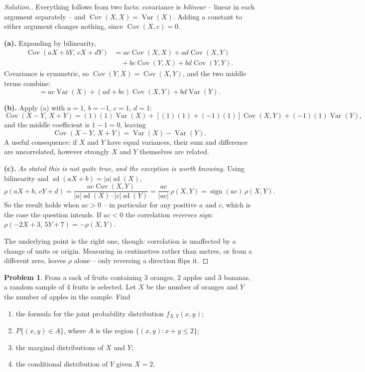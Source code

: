 \documentclass[12pt,a4paper]{report}
\theoremstyle{definition}
\theoremstyle{plain}
\theoremstyle{definition}
\newtheorem{problemx}{Problem}[section]
\newenvironment{problem}{\begin{problemx}}{\end{problemx}}
\newenvironment{solution}
  {\renewcommand{\qedsymbol}{}\begin{proof}[\textit{Solution}.]}
  {\end{proof}}
\begin{document}
\begin{solution}
Everything follows from two facts: covariance is \emph{bilinear} -- linear in each
argument separately -- and $\operatorname{Cov}(X,X) = \operatorname{Var}(X)$. Adding a
constant to either argument changes nothing, since $\operatorname{Cov}(X,c) = 0$.

\textbf{(a).} Expanding by bilinearity,
\begin{align*}
\operatorname{Cov}(aX+bY,\,cX+dY)
&= ac\operatorname{Cov}(X,X)+ad\operatorname{Cov}(X,Y)\\
&\quad + bc\operatorname{Cov}(Y,X)+bd\operatorname{Cov}(Y,Y).
\end{align*}
Covariance is symmetric, so $\operatorname{Cov}(Y,X) = \operatorname{Cov}(X,Y)$, and the
two middle terms combine:
\[= ac\operatorname{Var}(X)+(ad+bc)\operatorname{Cov}(X,Y)+bd\operatorname{Var}(Y).\]

\textbf{(b).} Apply (a) with $a=1$, $b=-1$, $c=1$, $d=1$:
\[\operatorname{Cov}(X-Y,\,X+Y) = (1)(1)\operatorname{Var}(X)
 +[(1)(1)+(-1)(1)]\operatorname{Cov}(X,Y)+(-1)(1)\operatorname{Var}(Y),\]
and the middle coefficient is $1-1 = 0$, leaving
\[\operatorname{Cov}(X-Y,\,X+Y) = \operatorname{Var}(X)-\operatorname{Var}(Y).\]
A useful consequence: if $X$ and $Y$ have equal variances, their sum and difference are
uncorrelated, however strongly $X$ and $Y$ themselves are related.

\textbf{(c).} \emph{As stated this is not quite true, and the exception is worth knowing.}
Using bilinearity and $\operatorname{sd}(aX+b) = |a|\operatorname{sd}(X)$,
\[\rho(aX+b,\,cY+d) = \frac{ac\operatorname{Cov}(X,Y)}
 {|a|\operatorname{sd}(X)\cdot|c|\operatorname{sd}(Y)}
 = \frac{ac}{|ac|}\,\rho(X,Y) = \operatorname{sign}(ac)\,\rho(X,Y).\]
So the result holds when $ac>0$ -- in particular for any positive $a$ and $c$, which is
the case the question intends. If $ac<0$ the correlation \emph{reverses sign}:
$\rho(-2X+3,\,5Y+7) = -\rho(X,Y)$.

The underlying point is the right one, though: correlation is unaffected by a change of
units or origin. Measuring in centimetres rather than metres, or from a different zero,
leaves $\rho$ alone -- only reversing a direction flips it.
\end{solution}

\begin{problem}
From a sack of fruits containing 3 oranges, 2 apples and 3 bananas, a random sample of 4
fruits is selected. Let $X$ be the number of oranges and $Y$ the number of apples in the
sample. Find
\begin{enumerate}
\item[(a).] the formula for the joint probability distribution $f_{X,Y}(x,y)$;
\item[(b).] $P\{(x,y)\in A\}$, where $A$ is the region $\{(x,y):x+y\leq 2\}$;
\item[(c).] the marginal distributions of $X$ and $Y$;
\item[(d).] the conditional distribution of $Y$ given $X=2$.
\end{enumerate}
\end{problem}
\end{document}
